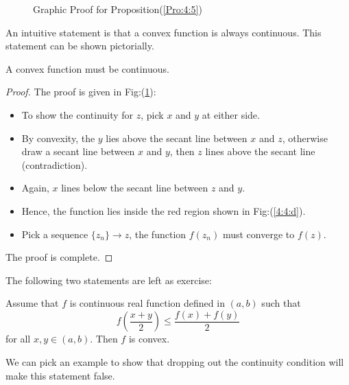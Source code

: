 \begin{figure}
{\begin{minipage}[b]{0.5\textwidth}
    \end{minipage}}%
  \caption{Graphic Proof for Proposition(\ref{Pro:4:5})} 
  \label{Graphic_proof} %
\end{figure}

An intuitive statement is that a convex function is always continuous. This statement can be shown pictorially.
\begin{proposition}\label{Pro:4:5}
A convex function must be continuous.
\end{proposition}
\begin{proof}
The proof is given in Fig:(\ref{Graphic_proof}):
\begin{itemize}
\item
To show the continuity for $z$, pick $x$ and $y$ at either side.
\item
By convexity, the $y$ lies above the secant line between $x$ and $z$, otherwise draw a secant line between $x$ and $y$, then $z$ lines above the secant line (contradiction).
\item
Again, $x$ lines below the secant line between $z$ and $y$.
\item
Hence, the function lies inside the red region shown in Fig:(\ref{4:4:d}).
\item
Pick a sequence $\{z_n\}\to z$, the function $f(z_n)$ must converge to $f(z)$.
\end{itemize}
The proof is complete.
\end{proof}
The following two statements are left as exercise:
\begin{proposition}
Assume that $f$ is continuous real function defined in $(a,b)$ such that
\[
f\left(\frac{x+y}{2}\right)\le\frac{f(x) + f(y)}{2}
\]
for all $x,y\in(a,b)$. Then $f$ is convex.
\end{proposition}
\begin{remark}
We can pick an example to show that dropping out the continuity condition will make this statement false.
\end{remark}


